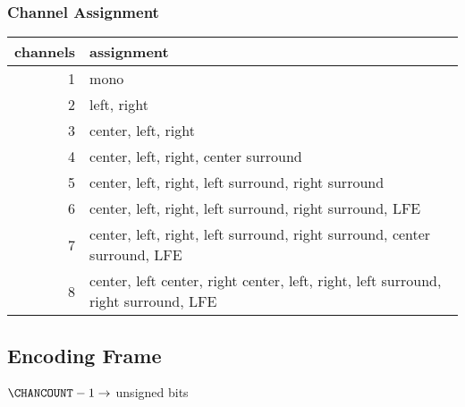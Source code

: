 \subsubsection{Channel Assignment}
\begin{tabular}{r|l}
channels & assignment \\
\hline
1 & mono \\
2 & left, right \\
3 & center, left, right \\
4 & center, left, right, center surround \\
5 & center, left, right, left surround, right surround \\
6 & center, left, right, left surround, right surround, LFE \\
7 & center, left, right, left surround, right surround, center surround, LFE \\
8 & center, left center, right center, left, right, left surround, right surround, LFE \\
\end{tabular}

\clearpage

\subsection{Encoding Frame}
\label{alac:encode_frame}
{
$\CHANCOUNT - 1 \rightarrow$  unsigned bits\;
\EALGORITHM
}

